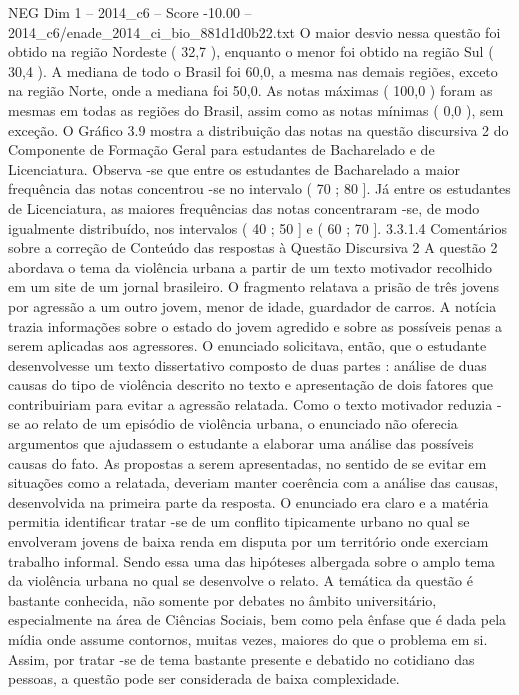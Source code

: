 \begin{textsample}{NEG Dim 1 – 2014\_c6 – Score -10.00 – 2014\_c6/enade\_2014\_ci\_bio\_881d1d0b22.txt}
O maior desvio nessa questão foi obtido na região Nordeste ( 32,7 ), enquanto o menor foi obtido na região Sul ( 30,4 ).
A mediana de todo o Brasil foi 60,0, a mesma nas demais regiões, exceto na região Norte, onde a mediana foi 50,0.
As notas máximas ( 100,0 ) foram as mesmas em todas as regiões do Brasil, assim como as notas mínimas ( 0,0 ), sem exceção.
O Gráfico 3.9 mostra a distribuição das notas na questão discursiva 2 do Componente de Formação Geral para estudantes de Bacharelado e de Licenciatura.
Observa -se que entre os estudantes de Bacharelado a maior frequência das notas concentrou -se no intervalo ( 70 ; 80 ].
Já entre os estudantes de Licenciatura, as maiores frequências das notas concentraram -se, de modo igualmente distribuído, nos intervalos ( 40 ; 50 ] e ( 60 ; 70 ]. 3.3.1.4 Comentários sobre a correção de Conteúdo das respostas à Questão Discursiva 2 A questão 2 abordava o tema da violência urbana a partir de um texto motivador recolhido em um site de um jornal brasileiro.
O fragmento relatava a prisão de três jovens por agressão a um outro jovem, menor de idade, guardador de carros.
A notícia trazia informações sobre o estado do jovem agredido e sobre as possíveis penas a serem aplicadas aos agressores.
O enunciado solicitava, então, que o estudante desenvolvesse um texto dissertativo composto de duas partes : análise de duas causas do tipo de violência descrito no texto e apresentação de dois fatores que contribuiriam para evitar a agressão relatada.
Como o texto motivador reduzia -se ao relato de um episódio de violência urbana, o enunciado não oferecia argumentos que ajudassem o estudante a elaborar uma análise das possíveis causas do fato.
As propostas a serem apresentadas, no sentido de se evitar em situações como a relatada, deveriam manter coerência com a análise das causas, desenvolvida na primeira parte da resposta.
O enunciado era claro e a matéria permitia identificar tratar -se de um conflito tipicamente urbano no qual se envolveram jovens de baixa renda em disputa por um território onde exerciam trabalho informal.
Sendo essa uma das hipóteses albergada sobre o amplo tema da violência urbana no qual se desenvolve o relato.
A temática da questão é bastante conhecida, não somente por debates no âmbito universitário, especialmente na área de Ciências Sociais, bem como pela ênfase que é dada pela mídia onde assume contornos, muitas vezes, maiores do que o problema em si.
Assim, por tratar -se de tema bastante presente e debatido no cotidiano das pessoas, a questão pode ser considerada de baixa complexidade.

\end{textsample}
